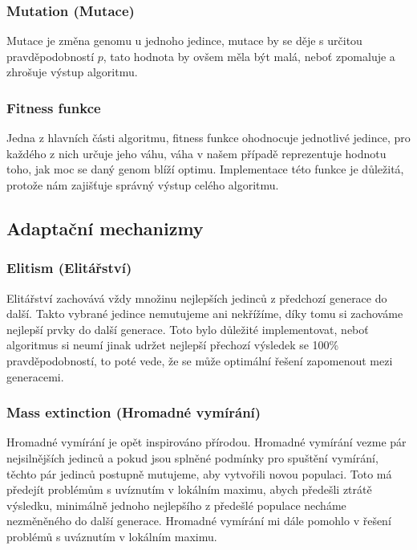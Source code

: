 \documentclass{article}
\begin{document}
    \subsubsection{Mutation (Mutace)}

    Mutace je změna genomu u jednoho jedince, mutace by se děje s určitou pravděpodobností $p$, tato hodnota by ovšem měla být malá, neboť zpomaluje a zhrošuje výstup algoritmu.

    \subsubsection{Fitness funkce}

    Jedna z hlavních části algoritmu, fitness funkce ohodnocuje jednotlivé jedince, pro každého z nich určuje jeho váhu, váha v našem případě reprezentuje hodnotu toho, jak
    moc se daný genom blíží optimu. Implementace této funkce je důležitá, protože nám zajišťuje správný výstup celého algoritmu.

    \subsection{Adaptační mechanizmy}

    \subsubsection{Elitism (Elitářství)}

    Elitářství zachovává vždy množinu nejlepších jedinců z předchozí generace do další. Takto vybrané jedince nemutujeme ani nekřížíme, díky tomu si zachováme nejlepší prvky do další
    generace. Toto bylo důležité implementovat, neboť algoritmus si neumí jinak udržet nejlepší přechozí výsledek se 100\% pravděpodobností, to poté vede, že se může optimální řešení
    zapomenout mezi generacemi.

    \subsubsection{Mass extinction (Hromadné vymírání)}

    Hromadné vymírání je opět inspirováno přírodou. Hromadné vymírání vezme pár nejsilnějších jedinců a pokud jsou splněné podmínky pro spuštění vymírání, těchto pár jedinců
    postupně mutujeme, aby vytvořili novou populaci. Toto má předejít problémům s uvíznutím v lokálním maximu, abych předešli ztrátě výsledku, minimálně jednoho nejlepšího z předešlé
    populace necháme nezměněného do další generace. Hromadné vymírání mi dále pomohlo v řešení problémů s uváznutím v lokálním maximu.
\end{document}
